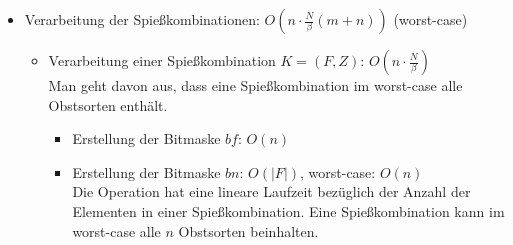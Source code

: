 \begin{itemize}
\begin{itemize}
    \item Umwandlung der Obstsorten in allen Spießkombinationen von Strings zu Integers:
    $O(m \cdot n \log n)$\\
    In jeder Spießkombination können sich im worst-case alle $n$ Obstsorten befinden.
    Das Suchen in einer  hat logarithmische Laufzeit bezüglich der Anzahl
    der Obstsorten: $O(\log n)$.
    Das Einfügen in eine  hat ebenfalls logarithmische Laufzeit bezüglich der Anzahl
    der Obstsorten: $O(\log n)$. 
    Deshalb beträgt die Laufzeit für alle Obstsorten in einer Spießkombination höchstens: $O(n \log n)$. 

    \item Die gesamte Laufzeit für diesen Teil (worst-case): $O(n \cdot \frac{N}{\beta}) + O(n) + O(w \log w)
    + O(n \log n) + O(m \cdot n \log n) + O(w (\log n + \log w)) + O(m \cdot n \log n) = 
    O(n \cdot \frac{N}{\beta} + n + w \log w + n \log n + m \cdot n \log n + w (\log n + \log w) +
    m \cdot n \log n) = 
    O(n \cdot \frac{N}{\beta} + m \cdot n \log n + w (\log n + \log w)) = 
    O(n (\frac{N}{\beta} + m \log n) + w (\log n + \log w))$\\
    Man darf nicht vergessen, dass die Laufzeit optimiert werden könnte, wenn die Eingabe nicht
    aus Wörtern bestünde, sondern aus Zahlen. Man könnte beispielsweise die Wörter früher in Zahlen umwandeln lassen.  
  \end{itemize}


  \item Verarbeitung der Spießkombinationen: $O(n\cdot \frac{N}{\beta}(m + n))$ (worst-case)
  \begin{itemize}
    \item Verarbeitung einer Spießkombination $K = (F, Z)$: $O(n \cdot\frac{N}{\beta})$\\
    Man geht davon aus, dass eine Spießkombination im worst-case alle Obstsorten enthält.
    \begin{itemize}
      \item Erstellung der Bitmaske $bf$: $O(n)$

      \item Erstellung der Bitmaske $bn$: $O(|F|)$, worst-case: $O(n)$\\
      Die Operation hat eine lineare Laufzeit bezüglich der Anzahl der Elementen in 
      einer Spießkombination. Eine Spießkombination kann im worst-case alle $n$
      Obstsorten beinhalten.


\end{itemize}
\end{itemize}
\end{itemize}
